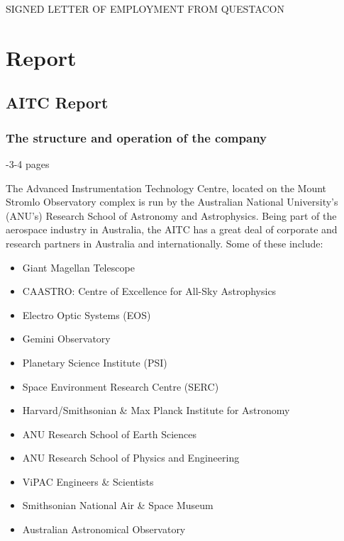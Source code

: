 \documentclass[11pt]{article}
\begin{document}
SIGNED LETTER OF EMPLOYMENT FROM QUESTACON

\newpage

\section{Report}

\subsection{AITC Report}

\subsubsection{The structure and operation of the company}
-3-4 pages

The Advanced Instrumentation Technology Centre, located on the Mount Stromlo Observatory complex is run by the Australian National University's (ANU's) Research School of Astronomy and Astrophysics. Being part of the aerospace industry in Australia, the AITC has a great deal of corporate and research partners in Australia and internationally. Some of these include:

\begin{itemize}

\item Giant Magellan Telescope

\item CAASTRO: Centre of Excellence for All-Sky Astrophysics

\item Electro Optic Systems (EOS)

\item Gemini Observatory

\item Planetary Science Institute (PSI)

\item Space Environment Research Centre (SERC)

\item Harvard/Smithsonian \& Max Planck Institute for Astronomy

\item ANU Research School of Earth Sciences

\item ANU Research School of Physics and Engineering 

\item ViPAC Engineers \& Scientists

\item Smithsonian National Air \& Space Museum

\item Australian Astronomical Observatory

\end{itemize}
\end{document}
